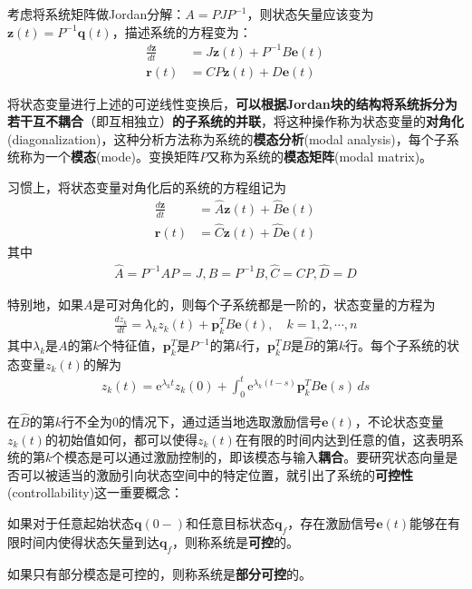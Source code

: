 考虑将系统矩阵做Jordan分解：$A=PJP^{-1}$，则状态矢量应该变为$\mathbf{z}(t)=P^{-1}\mathbf{q}(t)$，描述系统的方程变为：\begin{align*}
    \frac{d\mathbf{z}}{dt}&=J\mathbf{z}(t)+P^{-1}B\mathbf{e}(t)\\
    \mathbf{r}(t)&=CP\mathbf{z}(t)+D\mathbf{e}(t)
\end{align*}

将状态变量进行上述的可逆线性变换后，\textbf{可以根据Jordan块的结构将系统拆分为若干互不耦合}（即互相独立）\textbf{的子系统的并联}，将这种操作称为状态变量的\textbf{对角化}(diagonalization)，这种分析方法称为系统的\textbf{模态分析}(modal analysis)，每个子系统称为一个\textbf{模态}(mode)。变换矩阵$P$又称为系统的\textbf{模态矩阵}(modal matrix)。

习惯上，将状态变量对角化后的系统的方程组记为\begin{align*}
    \frac{d\mathbf{z}}{dt}&=\hat{A}\mathbf{z}(t)+\hat{B}\mathbf{e}(t)\\
    \mathbf{r}(t)&=\hat{C}\mathbf{z}(t)+\hat{D}\mathbf{e}(t)
\end{align*}
其中\begin{align*}
    \hat{A}=P^{-1}AP=J,\hat{B}=P^{-1}B,\hat{C}=CP,\hat{D}=D
\end{align*}

特别地，如果$A$是可对角化的，则每个子系统都是一阶的，状态变量的方程为\begin{align*}
    \frac{dz_k}{dt}=\lambda_k z_k(t)+\mathbf{p}_k^T B\mathbf{e}(t),\quad k=1,2,\cdots,n
\end{align*}
其中$\lambda_k$是$A$的第$k$个特征值，$\mathbf{p}_k^T$是$P^{-1}$的第$k$行，$\mathbf{p}_k^T B$是$\hat{B}$的第$k$行。每个子系统的状态变量$z_k(t)$的解为\begin{align*}
    z_k(t)=\mathrm{e}^{\lambda_k t}z_k(0)+\int_0^t \mathrm{e}^{\lambda_k (t-s)}\mathbf{p}_k^TB\mathbf{e}(s)\,ds
\end{align*}

在$\hat{B}$的第$k$行不全为0的情况下，通过适当地选取激励信号$\mathbf{e}(t)$，不论状态变量$z_k(t)$的初始值如何，都可以使得$z_k(t)$在有限的时间内达到任意的值，这表明系统的第$k$个模态是可以通过激励控制的，即该模态与输入\textbf{耦合}。要研究状态向量是否可以被适当的激励引向状态空间中的特定位置，就引出了系统的\textbf{可控性}(controllability)这一重要概念：

\begin{definition}[可控性]
    如果对于任意起始状态$\mathbf{q}(0-)$和任意目标状态$\mathbf{q}_f$，存在激励信号$\mathbf{e}(t)$能够在有限时间内使得状态矢量到达$\mathbf{q}_f$，则称系统是\textbf{可控}的。

    如果只有部分模态是可控的，则称系统是\textbf{部分可控}的。
\end{definition}

